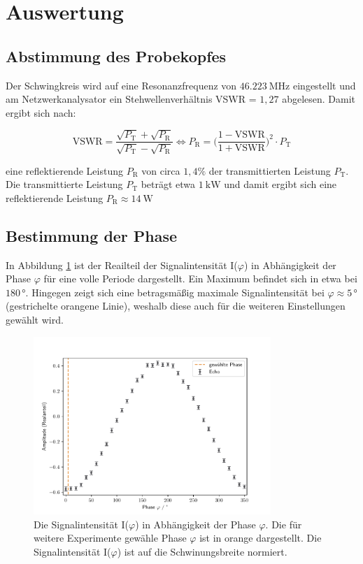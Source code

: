 \section{Auswertung}
\label{sec:Auswertung}

\subsection{Abstimmung des Probekopfes}
\label{sec:Abstimmung}
Der Schwingkreis wird auf eine Resonanzfrequenz von $\SI{46,223}{\mega\hertz}$
eingestellt und am Netzwerkanalysator ein Stehwellenverhältnis VSWR =
$\si{1,27}$ abgelesen. Damit ergibt sich nach:

\begin{equation}
    \text{VSWR} = \frac{\sqrt{P_{\text{T}}} + \sqrt{P_{\text{R}}}}
                {\sqrt{P_{\text{T}}} - \sqrt{P_{\text{R}}}}
    \iff
    P_{\text{R}} = \biggl( \frac{1-\text{VSWR}}{1+\text{VSWR}} \biggr)^2 \cdot P_{\text{T}}
\end{equation}

\noindent
eine reflektierende Leistung $P_{\text{R}}$ von circa $1,4\%$ der transmittierten
Leistung $P_{\text{T}}$. Die transmittierte Leistung $P_{\text{T}}$ beträgt etwa
$\SI{1}{\kilo\watt}$ und damit ergibt sich eine reflektierende Leistung
$P_{\text{R}} \approx \SI{14}{\watt}$

\subsection{Bestimmung der Phase}
\label{sec:phase}
In Abbildung \ref{fig:phase} ist der Reailteil der Signalintensität I($\varphi$) in Abhängigkeit
der Phase $\varphi$ für eine volle Periode dargestellt. Ein Maximum befindet sich
in etwa bei $180\,°$. Hingegen zeigt sich eine betragsmäßig maximale Signalintensität
bei $\varphi\approx 5\,°$ (gestrichelte orangene Linie), weshalb diese
auch für die weiteren Einstellungen gewählt wird.

\begin{figure}[H]
    \centering
    \includegraphics[width=0.8\textwidth]{Auswertung/winkel.pdf}
    \caption{Die Signalintensität I($\varphi$) in Abhängigkeit der Phase $\varphi$.
    Die für weitere Experimente gewähle Phase $\varphi$ ist in orange dargestellt.
    Die Signalintensität I($\varphi$) ist auf die Schwinungsbreite normiert.}
    \label{fig:phase}
\end{figure}

